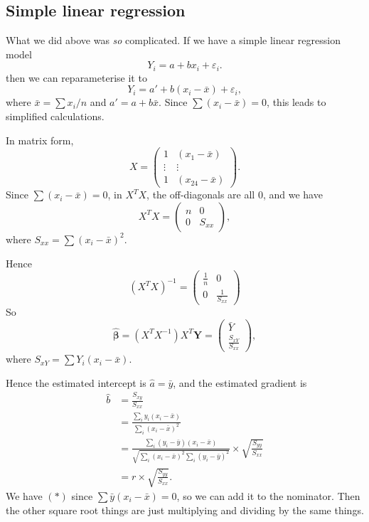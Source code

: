 \documentclass[a4paper]{article}
\begin{document}
\subsection{Simple linear regression}
What we did above was \emph{so} complicated. If we have a simple linear regression model
\[
  Y_i = a + bx_i + \varepsilon_i.
\]
then we can reparameterise it to
\[
  Y_i = a' + b(x_i - \bar x) + \varepsilon_i,\tag{6}
\]
where $\bar x = \sum x_i/n$ and $a' = a + b\bar x$. Since $\sum (x_i - \bar x) = 0$, this leads to simplified calculations.

In matrix form,
\[
  X =
  \begin{pmatrix}
    1 & (x_1 - \bar x)\\
    \vdots & \vdots \\
    1 & (x_{24} - \bar x)
  \end{pmatrix}.
\]
Since $\sum (x_i - \bar x) = 0$, in $X^TX$, the off-diagonals are all $0$, and we have
\[
  X^TX =
  \begin{pmatrix}
    n & 0\\
    0 & S_{xx}
  \end{pmatrix},
\]
where $S_{xx} = \sum (x_i - \bar x)^2$.

Hence
\[
  (X^TX)^{-1} =
  \begin{pmatrix}
    \frac{1}{n} & 0\\
    0 & \frac{1}{S_{xx}}
  \end{pmatrix}
\]
So
\[
  \hat{\boldsymbol\beta} = (X^TX^{-1})X^T \mathbf{Y} =
  \begin{pmatrix}
    \bar Y \\
    \frac{S_{xY}}{S_{xx}}
  \end{pmatrix},
\]
where $S_{xY} = \sum Y_i(x_i - \bar x)$.

Hence the estimated intercept is $\hat{a} = \bar y$, and the estimated gradient is
\begin{align*}
  \hat{b} &= \frac{S_{xy}}{S_{xx}}\\
  &= \frac{\sum_i y_i(x_i - \bar x)}{\sum_i (x_i - \bar x)^2}\\
  &= \frac{\sum_i (y_i - \bar y)(x_i - \bar x)}{\sqrt{\sum_i (x_i - \bar x)^2\sum_i (y_i - \bar y)^2}}\times \sqrt{\frac{S_{yy}}{S_{xx}}}\tag{$*$}\\
  &= r \times \sqrt{\frac{S_{yy}}{S_{xx}}}.
\end{align*}
We have $(*)$ since $\sum \bar y(x_i - \bar x) = 0$, so we can add it to the nominator. Then the other square root things are just multiplying and dividing by the same things.
\end{document}
